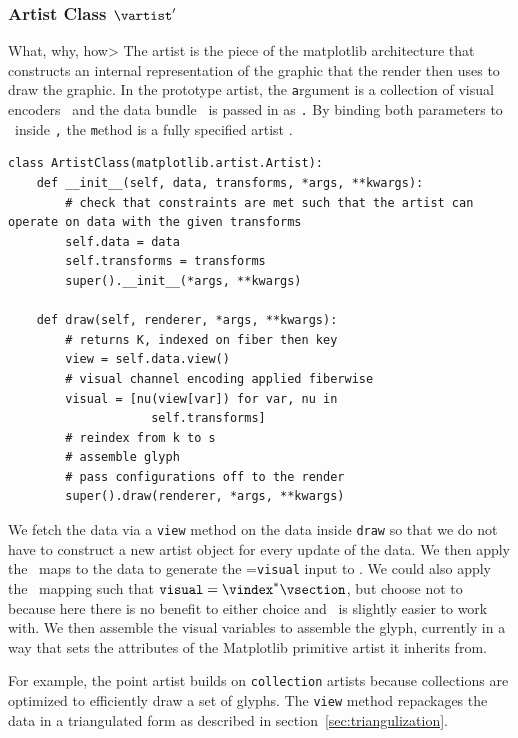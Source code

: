 \documentclass[../main.tex]{subfiles}
\begin{document}
\subsubsection{Artist Class $\vartist^{\prime}$}
What, why, how>
The artist is the piece of the matplotlib architecture that constructs an internal representation of the graphic that the render then uses to draw the graphic. In the prototype artist, the \texttt argument is a collection of  visual encoders \vchannel\ and the data bundle \vtotal\ is passed in as \texttt. By binding both parameters to \vartisteq\ inside \texttt, the \texttt method is a fully specified artist \vartist. 
\begin{verbatim}
class ArtistClass(matplotlib.artist.Artist):
    def __init__(self, data, transforms, *args, **kwargs):
        # check that constraints are met such that the artist can operate on data with the given transforms
        self.data = data 
        self.transforms = transforms
        super().__init__(*args, **kwargs)

    def draw(self, renderer, *args, **kwargs):
        # returns K, indexed on fiber then key 
        view = self.data.view() 
        # visual channel encoding applied fiberwise 
        visual = [nu(view[var]) for var, nu in 
                    self.transforms]
        # reindex from k to s
        # assemble glyph              
        # pass configurations off to the render
        super().draw(renderer, *args, **kwargs)
\end{verbatim}
We fetch the data via a \texttt{view} method on the data inside \texttt{draw} so that we do not have to construct a new artist object for every update of the data. We then apply the \vchannel\ maps to the data to generate the \vsection=\texttt{visual} input to \vmark. We could also apply the \vindex\ mapping such that $\texttt{visual}=\vindex^*\vsection$, but choose not to because here there is no benefit to either choice and \vsection\ is slightly easier to work with. We then assemble the visual variables to assemble the glyph, currently in a way that sets the attributes of the Matplotlib primitive artist it inherits from. 

For example, the point artist builds on \texttt{collection} artists because collections are optimized to efficiently draw a set of glyphs. The \texttt{view} method repackages the data in a triangulated form as described in section~\ref{sec:triangulization}. 
\end{document}
